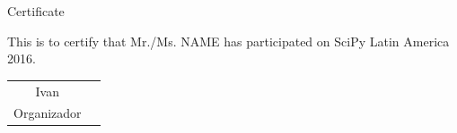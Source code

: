 \documentclass[12pt,a4paper,landscape]{article}
\begin{document}
\vspace*{5cm}

\begin{center}
  \Huge Certificate
\end{center}

This is to certify that Mr./Ms. NAME
has participated on SciPy Latin America 2016.

\vspace*{1cm}

\begin{tabular}{cc}
  Ivan \\
  Organizador
\end{tabular}
\end{document}
